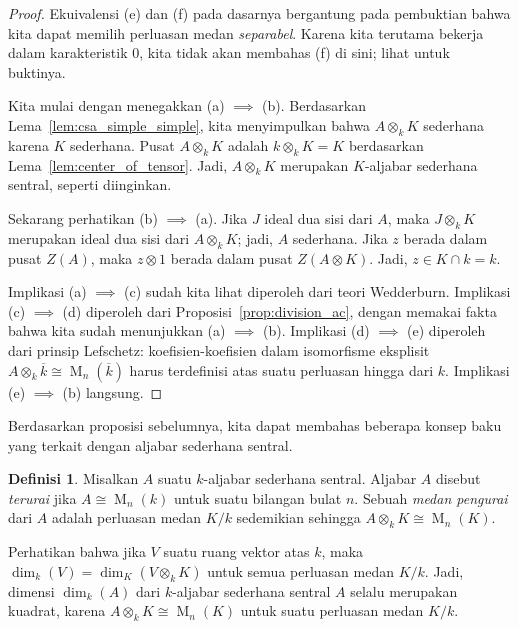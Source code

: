 \documentclass[12pt]{article}
\theoremstyle{plain}
\theoremstyle{definition}
\newtheorem{definition}[theorem]{Definisi}
\theoremstyle{remark}
\numberwithin{equation}{section}
\begin{document}
\begin{proof}
Ekuivalensi (e) dan (f) pada dasarnya bergantung pada pembuktian bahwa kita dapat
memilih perluasan medan \emph{separabel}.
Karena kita terutama bekerja dalam
karakteristik $0$, kita tidak akan membahas (f) di sini;
lihat \cite[Proposition 2.2.5]{GS} untuk buktinya.

Kita mulai dengan menegakkan (a) $\implies$ (b).
Berdasarkan Lema~\ref{lem:csa_simple_simple}, kita menyimpulkan bahwa $A \otimes_k K$
sederhana karena $K$ sederhana. Pusat $A \otimes_k K$
adalah $k \otimes_k K=K$ berdasarkan Lema~\ref{lem:center_of_tensor}.
Jadi, $A \otimes_k K$ merupakan $K$-aljabar sederhana sentral, seperti diinginkan.

Sekarang perhatikan (b) $\implies$ (a).
Jika $J$ ideal dua sisi dari $A$, maka $J \otimes_k K$ merupakan
ideal dua sisi dari $A \otimes_k K$; jadi, $A$ sederhana.
Jika $z$ berada dalam pusat $Z(A)$, maka $z \otimes 1$ berada dalam
pusat $Z(A \otimes K)$. Jadi, $z \in K \cap k = k$.

Implikasi (a) $\implies$ (c) sudah kita lihat diperoleh dari
teori Wedderburn.
Implikasi (c) $\implies$ (d) diperoleh dari
Proposisi~\ref{prop:division_ac},
dengan memakai fakta bahwa kita sudah menunjukkan (a) $\implies$ (b).
Implikasi (d) $\implies$ (e) diperoleh dari prinsip Lefschetz:
koefisien-koefisien dalam isomorfisme eksplisit
$A \otimes_k \overline{k} \cong \operatorname{M}_n(\overline{k})$
harus terdefinisi atas suatu perluasan hingga dari $k$.
Implikasi (e) $\implies$ (b) langsung.
\end{proof}

Berdasarkan proposisi sebelumnya, kita dapat membahas beberapa
konsep baku yang terkait dengan aljabar sederhana sentral.

\begin{definition}
Misalkan $A$ suatu $k$-aljabar sederhana sentral.
Aljabar $A$ disebut \emph{terurai} jika $A \cong \operatorname{M}_n(k)$
untuk suatu bilangan bulat $n$. Sebuah \emph{medan pengurai} dari $A$ adalah
perluasan medan $K/k$ sedemikian sehingga $A \otimes_k K \cong \operatorname{M}_n(K)$.
\end{definition}

Perhatikan bahwa jika $V$ suatu ruang vektor atas $k$,
maka $\dim_k(V) = \dim_K(V \otimes_k K)$
untuk semua perluasan medan $K/k$.
Jadi, dimensi $\dim_k(A)$ dari $k$-aljabar sederhana sentral $A$
selalu merupakan kuadrat, karena
$A \otimes_k K \cong \operatorname{M}_n(K)$ untuk suatu perluasan medan
$K/k$.
\end{document}
